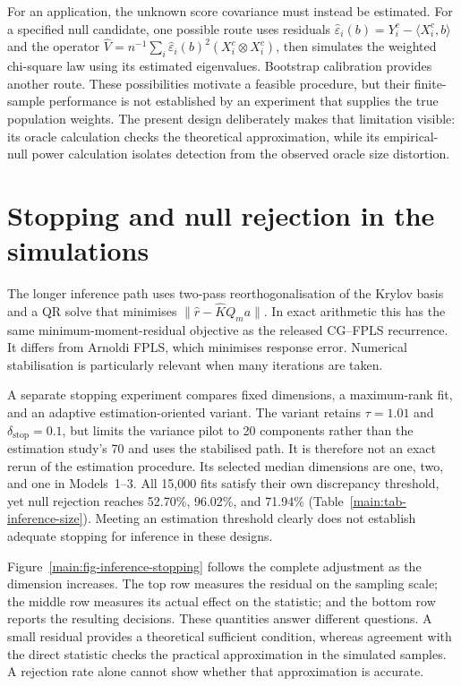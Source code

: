 For an application, the unknown score covariance must instead be estimated.
For a specified null candidate, one possible route uses residuals
$\widehat\varepsilon_i(b)=Y_i^c-\langle X_i^c,b\rangle$ and the operator
$\widehat V=n^{-1}\sum_i\widehat\varepsilon_i(b)^2
(X_i^c\otimes X_i^c)$, then simulates the weighted chi-square law using
its estimated eigenvalues.  Bootstrap calibration provides another route.
These possibilities motivate a feasible procedure, but their finite-sample
performance is not established by an experiment that supplies the true
population weights.  The present design deliberately makes that limitation
visible: its oracle calculation checks the theoretical approximation, while
its empirical-null power calculation isolates detection from the observed
oracle size distortion.

\section{Stopping and null rejection in the simulations}
\label{main:sec-inference-size}

The longer inference path uses two-pass reorthogonalisation of the Krylov
basis and a QR solve that minimises
$\|\widehat r-\widehat KQ_ma\|$.  In exact arithmetic this has the same
minimum-moment-residual objective as the released CG--FPLS recurrence.
It differs from Arnoldi FPLS, which minimises response error.  Numerical
stabilisation is particularly relevant when many iterations are taken.

A separate stopping experiment compares fixed dimensions, a maximum-rank
fit, and an adaptive estimation-oriented variant.  The variant retains
$\tau=1.01$ and $\delta_{\mathrm{stop}}=0.1$, but limits the variance pilot
to 20 components rather than the estimation study's 70 and uses the
stabilised path.  It is therefore not an exact rerun of the estimation
procedure.  Its selected median dimensions are one, two, and one in
Models~1--3.  All 15,000 fits satisfy their own discrepancy threshold,
yet null rejection reaches 52.70\%, 96.02\%, and 71.94\%
(Table~\ref{main:tab-inference-size}).  Meeting an estimation threshold
clearly does not establish adequate stopping for inference in these designs.

Figure~\ref{main:fig-inference-stopping} follows the complete adjustment as
the dimension increases.  The top row measures the residual on the sampling
scale; the middle row measures its actual effect on the statistic; and the
bottom row reports the resulting decisions.  These quantities answer
different questions.  A small residual provides a theoretical sufficient
condition, whereas agreement with the direct statistic checks the practical
approximation in the simulated samples.  A rejection rate alone cannot
show whether that approximation is accurate.

